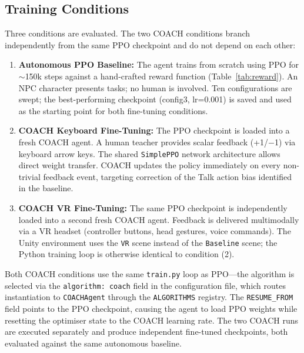 \documentclass[../report.tex]{subfiles}
\begin{document}
    \subsection{Training Conditions}
    \label{sec:methodology:pipeline}

    Three conditions are evaluated. The two COACH conditions branch independently from the same PPO checkpoint and do not depend on each other:

    \begin{enumerate}
        \item \textbf{Autonomous PPO Baseline:} The agent trains from scratch using PPO for $\sim$150k steps against a hand-crafted reward function (Table~\ref{tab:reward}). An NPC character presents tasks; no human is involved. Ten configurations are swept; the best-performing checkpoint (config3, lr=0.001) is saved and used as the starting point for both fine-tuning conditions.

        \item \textbf{COACH Keyboard Fine-Tuning:} The PPO checkpoint is loaded into a fresh COACH agent. A human teacher provides scalar feedback (+1/$-$1) via keyboard arrow keys. The shared \texttt{SimplePPO} network architecture allows direct weight transfer. COACH updates the policy immediately on every non-trivial feedback event, targeting correction of the Talk action bias identified in the baseline.

        \item \textbf{COACH VR Fine-Tuning:} The same PPO checkpoint is independently loaded into a second fresh COACH agent. Feedback is delivered multimodally via a VR headset (controller buttons, head gestures, voice commands). The Unity environment uses the \texttt{VR} scene instead of the \texttt{Baseline} scene; the Python training loop is otherwise identical to condition (2).
    \end{enumerate}

    Both COACH conditions use the same \texttt{train.py} loop as PPO—the algorithm is selected via the \texttt{algorithm: coach} field in the configuration file, which routes instantiation to \texttt{COACHAgent} through the \texttt{ALGORITHMS} registry. The \texttt{RESUME\_FROM} field points to the PPO checkpoint, causing the agent to load PPO weights while resetting the optimiser state to the COACH learning rate. The two COACH runs are executed separately and produce independent fine-tuned checkpoints, both evaluated against the same autonomous baseline.
\end{document}
